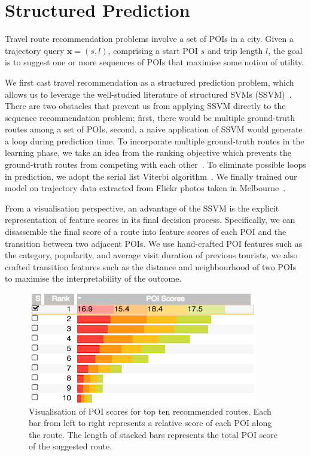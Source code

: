 \section{Structured Prediction}
Travel route recommendation problems involve a set of POIs in a city. 
Given a trajectory query $\mathbf{x} = (s, l)$, comprising a start POI $s$ and trip length $l$, the goal is to suggest one or more sequences of POIs that maximise some notion of utility.

We first cast travel recommendation as a structured prediction problem, which allows us to leverage the well-studied literature of structured SVMs (SSVM)~\cite{tsochantaridis2005large,joachims2009predicting}. 
There are two obstacles that prevent us from applying SSVM directly to the sequence recommendation problem; first, there would be multiple ground-truth routes among a set of POIs, second, a naive application of SSVM would generate a loop during prediction time. 
To incorporate multiple ground-truth routes in the learning phase, we take an idea from the ranking objective which prevents the ground-truth routes from competing with each other~\cite{rendle2009bpr}. 
To eliminate possible loops in prediction, we adopt the serial list Viterbi algorithm~\cite{seshadri1994list,nill1995list,nilsson2001sequentially}.
We finally trained our model on trajectory data extracted from Flickr photos taken in Melbourne~\cite{chen2016learning}.

From a visualisation perspective, an advantage of the SSVM is the explicit representation of feature scores in its final decision process. Specifically, we can disassemble the final score of a route into feature scores of each POI and the transition between two adjacent POIs. 
We use hand-crafted POI features such as the category, popularity, and average visit duration of previous tourists, we also crafted transition features such as the distance and neighbourhood of two POIs to maximise the interpretability of the outcome.

\begin{figure}[t!]
\includegraphics[width=0.8\linewidth]{figure/sample_stack.png}
\caption{Visualisation of POI scores for top ten recommended routes. Each bar from left to right represents a relative score of each POI along the route.
The length of stacked bars represents the total POI score of the suggested route.}
\label{fig:stack} \vspace{-2em}
\end{figure}
